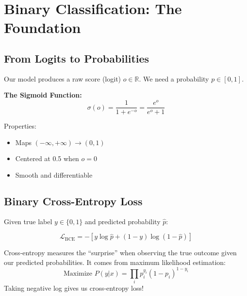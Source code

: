 \documentclass{article}
\begin{document}
\section{Binary Classification: The Foundation}

\subsection{From Logits to Probabilities}

Our model produces a raw score (logit) $o \in \mathbb{R}$. We need a probability $p \in [0,1]$.

\textbf{The Sigmoid Function:}
$$\sigma(o) = \frac{1}{1 + e^{-o}} = \frac{e^o}{e^o + 1}$$

\begin{center}
\end{center}

Properties:
\begin{itemize}
\item Maps $(-\infty, +\infty) \rightarrow (0, 1)$
\item Centered at 0.5 when $o = 0$
\item Smooth and differentiable
\end{itemize}

\subsection{Binary Cross-Entropy Loss}

Given true label $y \in \{0, 1\}$ and predicted probability $\hat{p}$:

$$\mathcal{L}_{\text{BCE}} = -[y \log \hat{p} + (1-y) \log(1-\hat{p})]$$

\begin{tcolorbox}[colback=blue!5!white, colframe=blue!50!black, title=Why Cross-Entropy?]
Cross-entropy measures the ``surprise'' when observing the true outcome given our predicted probabilities. It comes from maximum likelihood estimation:
$$\text{Maximize } P(y|x) = \prod_i p_i^{y_i}(1-p_i)^{1-y_i}$$
Taking negative log gives us cross-entropy loss!
\end{tcolorbox}
\end{document}
